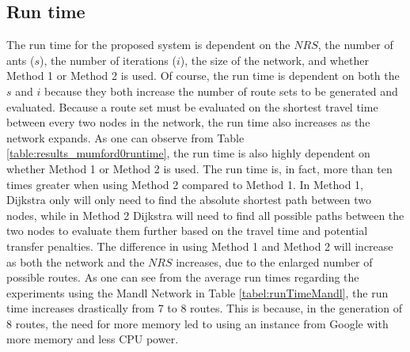 \subsection{Run time}
\label{subsec:runtime}

The run time for the proposed system is dependent on the $NRS$, the number of ants ($s$), the number of iterations ($i$), the size of the network, and whether Method 1 or Method 2 is used.  Of course, the run time is dependent on both the $s$ and $i$ because they both increase the number of route sets to be generated and evaluated. Because a route set must be evaluated on the shortest travel time between every two nodes in the network, the run time also increases as the network expands. As one can observe from Table \vref{table:results_mumford0runtime}, the run time is also highly dependent on whether Method 1 or Method 2 is used. The run time is, in fact, more than ten times greater when using Method 2 compared to Method 1. In Method 1, Dijkstra only will only need to find the absolute shortest path between two nodes, while in Method 2 Dijkstra will need to find all possible paths between the two nodes to evaluate them further based on the travel time and potential transfer penalties. The difference in using Method 1 and Method 2 will increase as both the network and the $NRS$ increases, due to the enlarged number of possible routes. As one can see from the average run times regarding the experiments using the Mandl Network in Table \vref{tabel:runTimeMandl}, the run time increases drastically from 7 to 8 routes. This is because, in the generation of 8 routes, the need for more memory led to using an instance from Google with more memory and less CPU power. 
 




